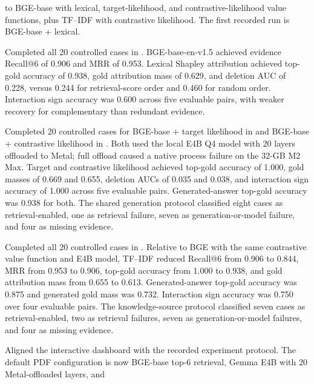 \begin{description}
  to BGE-base with lexical, target-likelihood, and contrastive-likelihood value
  functions, plus TF--IDF with contrastive likelihood. The first recorded run
  is BGE-base + lexical.
  \item[2026-06-14, BGE-base + lexical] Completed all 20 controlled cases in
  . BGE-base-en-v1.5 achieved
  evidence Recall@6 of 0.906 and MRR of 0.953. Lexical Shapley attribution
  achieved top-gold accuracy of 0.938, gold attribution mass of 0.629, and
  deletion AUC of 0.228, versus 0.244 for retrieval-score order and 0.460 for
  random order. Interaction sign accuracy was 0.600 across five evaluable
  pairs, with weaker recovery for complementary than redundant evidence.
  \item[2026-06-14, E4B likelihood runs] Completed 20 controlled cases for
  BGE-base + target likelihood in
   and BGE-base + contrastive
  likelihood in
  . Both used the local
  E4B Q4 model with 20 layers offloaded to Metal; full offload caused a native
  process failure on the 32-GB M2 Max. Target and contrastive likelihood
  achieved top-gold accuracy of 1.000, gold masses of 0.669 and 0.655,
  deletion AUCs of 0.035 and 0.038, and interaction sign accuracy of 1.000
  across five evaluable pairs. Generated-answer top-gold accuracy was 0.938
  for both. The shared generation protocol classified eight cases as
  retrieval-enabled, one as retrieval failure, seven as generation-or-model
  failure, and four as missing evidence.
  \item[2026-06-14, TF--IDF + E4B contrastive likelihood] Completed all 20
  controlled cases in
  . Relative to BGE with the
  same contrastive value function and E4B model, TF--IDF reduced Recall@6 from
  0.906 to 0.844, MRR from 0.953 to 0.906, top-gold accuracy from 1.000 to
  0.938, and gold attribution mass from 0.655 to 0.613. Generated-answer
  top-gold accuracy was 0.875 and generated gold mass was 0.732. Interaction
  sign accuracy was 0.750 over four evaluable pairs. The knowledge-source
  protocol classified seven cases as retrieval-enabled, two as retrieval
  failures, seven as generation-or-model failures, and four as missing
  evidence.
  \item[2026-06-14, research-demo interface] Aligned the interactive dashboard
  with the recorded experiment protocol. The default PDF configuration is now
  BGE-base top-6 retrieval, Gemma E4B with 20 Metal-offloaded layers, and

\end{description}
